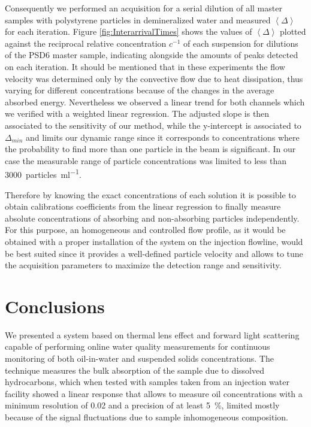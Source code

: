 \documentclass[9pt,twocolumn,twoside]{osajnl}
\begin{document}
Consequently we performed an acquisition for a serial dilution of all master samples with polystyrene particles in demineralized water and measured $\left\langle \Delta \right\rangle$ for each iteration. Figure \ref{fig:InterarrivalTimes} shows the values of $\left\langle \Delta \right\rangle$ plotted against the reciprocal relative concentration $c^{-1}$ of each suspension for dilutions of the PSD6 master sample, indicating alongside the amounts of peaks detected on each iteration. It should be mentioned that in these experiments the flow velocity was determined only by the convective flow due to heat dissipation, thus varying for different concentrations because of the changes in the average absorbed energy. Nevertheless we observed a linear trend for both channels which we verified with a weighted linear regression. The adjusted slope is then associated to the sensitivity of our method, while the y-intercept is associated to $\Delta_{min}$ and limits our dynamic range since it corresponds to concentrations where the probability to find more than one particle in the beam is significant. In our case the measurable range of particle concentrations was limited to less than \SI{3000}{particles\per\milli\litre}.

Therefore by knowing the exact concentrations of each solution it is possible to obtain calibrations coefficients from the linear regression to finally measure absolute concentrations of absorbing and non-absorbing particles independently. For this purpose, an homogeneous and controlled flow profile, as it would be obtained with a proper installation of the system on the injection flowline, would be best suited since it provides a well-defined particle velocity and allows to tune the acquisition parameters to maximize the detection range and sensitivity.



\section{Conclusions}
\label{Conclusions}

We presented a system based on thermal lens effect and forward light scattering capable of performing online water quality measurements for continuous monitoring of both oil-in-water and suspended solids concentrations. The technique measures the bulk absorption of the sample due to dissolved hydrocarbons, which when tested with samples taken from an injection water facility showed a linear response that allows to measure oil concentrations with a minimum resolution of \SI{0.02}{\ppm} and a precision of at least \SI{5}{\percent}, limited mostly because of the signal fluctuations due to sample inhomogeneous composition.
\end{document}
